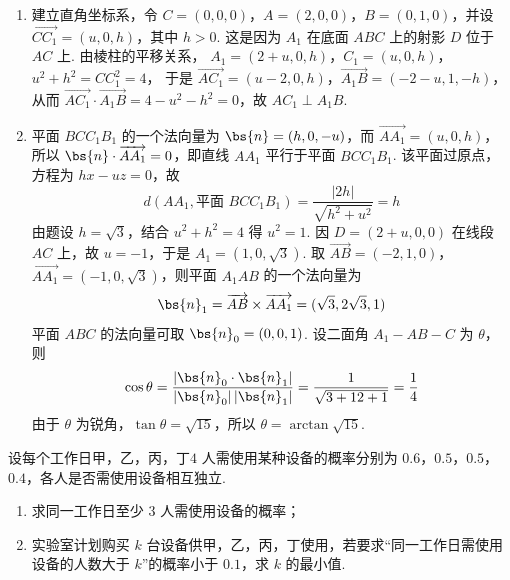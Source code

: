 \begin{solution}
\begin{enumerate}
\item 建立直角坐标系，令 \(C=(0,0,0)\)，\(A=(2,0,0)\)，\(B=(0,1,0)\)，并设
\(\overrightarrow{CC_1}=(u,0,h)\)，其中 \(h>0\). 这是因为 \(A_1\) 在底面 \(ABC\) 上的射影 \(D\) 位于 \(AC\) 上. 由棱柱的平移关系，
\(A_1=(2+u,0,h)\)，\(C_1=(u,0,h)\)，\(u^2+h^2=CC_1^2=4\)，
于是
\(\overrightarrow{AC_1}=(u-2,0,h)\)，\(\overrightarrow{A_1B}=(-2-u,1,-h)\)，
从而
\(\overrightarrow{AC_1}\cdot\overrightarrow{A_1B}=4-u^2-h^2=0\)，故 \(AC_1\perp A_1B\).
\item 平面 \(BCC_1B_1\) 的一个法向量为
\(\bs{n}=(h,0,-u)\)，而
\(\overrightarrow{AA_1}=(u,0,h)\)，所以
\(\bs{n}\cdot\overrightarrow{AA_1}=0\)，即直线 \(AA_1\) 平行于平面 \(BCC_1B_1\). 该平面过原点，方程为 \(hx-uz=0\)，故
\[
d(AA_1,\text{平面 }BCC_1B_1)
=\frac{|2h|}{\sqrt{h^2+u^2}}=h
\]
由题设 \(h=\sqrt3\)，结合 \(u^2+h^2=4\) 得 \(u^2=1\). 因 \(D=(2+u,0,0)\) 在线段 \(AC\) 上，故 \(u=-1\)，于是 \(A_1=(1,0,\sqrt3)\).
取
\(\overrightarrow{AB}=(-2,1,0)\)，\(\overrightarrow{AA_1}=(-1,0,\sqrt3)\)，则平面 \(A_1AB\) 的一个法向量为
\[
\bs{n}_1=\overrightarrow{AB}\times\overrightarrow{AA_1}=(\sqrt3,2\sqrt3,1)
\]
平面 \(ABC\) 的法向量可取 \(\bs{n}_0=(0,0,1)\). 设二面角 \(A_1-AB-C\) 为 \(\theta\)，则
\[
\cos\theta=\frac{|\bs{n}_0\cdot\bs{n}_1|}{|\bs{n}_0|\,|\bs{n}_1|}
=\frac{1}{\sqrt{3+12+1}}=\frac14
\]
由于 \(\theta\) 为锐角，\(\tan\theta=\sqrt{15}\)，所以 \(\theta=\arctan\sqrt{15}\).
\end{enumerate}
\end{solution}

\begin{problem}
设每个工作日甲，乙，丙，丁\(4\text{ 人}\)需使用某种设备的概率分别为 \(0.6\)，\(0.5\)，\(0.5\)，\(0.4\)，各人是否需使用设备相互独立.

\begin{enumerate}
\item 求同一工作日至少 \(3\) 人需使用设备的概率；
\item 实验室计划购买 \(k\) 台设备供甲，乙，丙，丁使用，若要求“同一工作日需使用设备的人数大于 \(k\)”的概率小于 \(0.1\)，求 \(k\) 的最小值.
\end{enumerate}
\end{problem}

